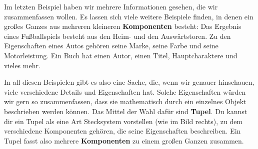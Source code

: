 \documentclass[../../main.tex]{subfiles}
\begin{document}

Im letzten Beispiel haben wir mehrere Informationen gesehen, die wir zusammenfassen wollen. Es lassen sich viele weitere Beispiele finden, in denen ein großes Ganzes aus mehreren kleineren \textbf{Komponenten} besteht: Das Ergebnis eines Fußballspiels besteht aus den Heim- und den Auswärtstoren. Zu den Eigenschaften eines Autos gehören seine Marke, seine Farbe und seine Motorleistung. Ein Buch hat einen Autor, einen Titel, Hauptcharaktere und vieles mehr.


In all diesen Beispielen gibt es also eine Sache, die, wenn wir genauer hinschauen, viele verschiedene Details und Eigenschaften hat. Solche Eigenschaften würden wir gern so zusammenfassen, dass sie mathematisch durch ein einzelnes Objekt beschrieben werden können. Das Mittel der Wahl dafür sind \textbf{Tupel}. Du kannst dir ein Tupel als eine Art Stecksystem vorstellen (wie im Bild rechts), zu dem verschiedene Komponenten gehören, die seine Eigenschaften beschreiben. Ein Tupel fasst also mehrere \textbf{Komponenten} zu einem großen Ganzen zusammen.
\end{document}
